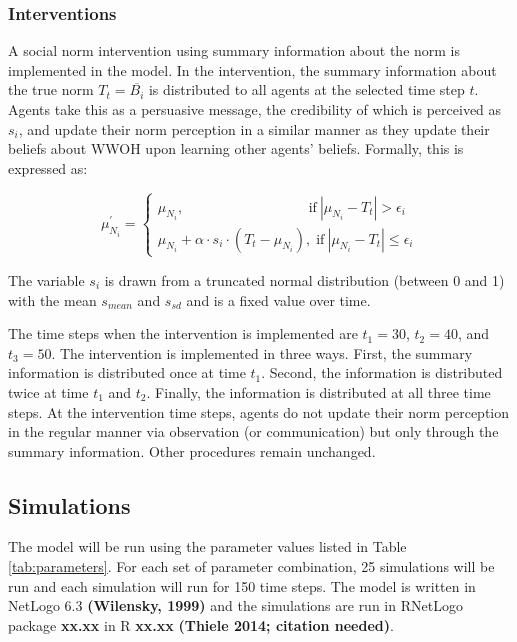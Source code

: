 \documentclass[
  11pt,
]{article}
\begin{document}
\hypertarget{interventions}{%
\subsubsection{Interventions}\label{interventions}}

A social norm intervention using summary information about the norm is
implemented in the model. In the intervention, the summary information
about the true norm \(T_t = \overline{B_i}\) is distributed to all
agents at the selected time step \(t\). Agents take this as a persuasive
message, the credibility of which is perceived as \(s_i\), and update
their norm perception in a similar manner as they update their beliefs
about WWOH upon learning other agents' beliefs. Formally, this is
expressed as:

\begin{equation}
  \mu_{N_i}^{\prime} = \begin{cases}
    \mu_{N_i}, \;\;\;\;\;\;\;\;\;\;\;\;\;\;\;\;\;\;\;\;\;\;\;\;\;\;\;\;\;\;\;\; \text{if} \: |\mu_{N_i} - T_t| > \epsilon_i \\
    \mu_{N_i} + \alpha \cdot s_i \cdot (T_t - \mu_{N_i}), \; \text{if} \: |\mu_{N_i} - T_t| \le \epsilon_i
  \end{cases}
\end{equation}

The variable \(s_i\) is drawn from a truncated normal distribution
(between 0 and 1) with the mean \(s_{mean}\) and \(s_{sd}\) and is a
fixed value over time.

The time steps when the intervention is implemented are \(t_1 = 30\),
\(t_2 = 40\), and \(t_3 = 50\). The intervention is implemented in three
ways. First, the summary information is distributed once at time
\(t_1\). Second, the information is distributed twice at time \(t_1\)
and \(t_2\). Finally, the information is distributed at all three time
steps. At the intervention time steps, agents do not update their norm
perception in the regular manner via observation (or communication) but
only through the summary information. Other procedures remain unchanged.

\hypertarget{simulations}{%
\subsection{Simulations}\label{simulations}}

The model will be run using the parameter values listed in Table
\ref{tab:parameters}. For each set of parameter combination, 25
simulations will be run and each simulation will run for 150 time steps.
The model is written in NetLogo 6.3 \textbf{(Wilensky, 1999)} and the
simulations are run in RNetLogo package \textbf{xx.xx} in R
\textbf{xx.xx} \textbf{(Thiele 2014; citation needed)}.
\end{document}
